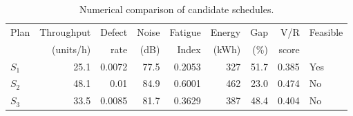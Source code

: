 \begin{table}[htbp]
\centering
\caption{Numerical comparison of candidate schedules.}
\label{tab:numerical-sim}
\small
\begin{tabular}{@{}lrrrrrrrl@{}}
\toprule
Plan & Throughput & Defect & Noise & Fatigue & Energy & Gap & V/R & Feasible \\
     & (units/h)  & rate   & (dB)  & Index   & (kWh)  & (\%) & score &         \\
\midrule
$S_{1}$ & 25.1 & 0.0072 & 77.5 & 0.2053 & 327 & 51.7 & 0.385 & Yes \\
$S_{2}$ & 48.1 & 0.01 & 84.9 & 0.6001 & 462 & 23.0 & 0.474 & No \\
$S_{3}$ & 33.5 & 0.0085 & 81.7 & 0.3629 & 387 & 48.4 & 0.404 & No \\
\bottomrule
\end{tabular}
\end{table}
